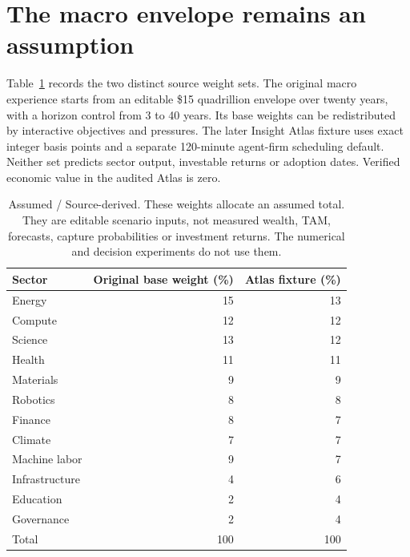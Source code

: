 \documentclass[11pt,a4paper]{article}
\newcommand{\assum}{\textsf{Assumed}}
\newcommand{\source}{\textsf{Source-derived}}
\begin{document}
\section{The macro envelope remains an assumption}\label{app:macro}
Table~\ref{tab:macro} records the two distinct source weight sets. The original macro experience starts from an editable \$15 quadrillion envelope over twenty years, with a horizon control from 3 to 40 years. Its base weights can be redistributed by interactive objectives and pressures. The later Insight Atlas fixture uses exact integer basis points and a separate 120-minute agent-firm scheduling default. Neither set predicts sector output, investable returns or adoption dates. Verified economic value in the audited Atlas is zero. \citep{atlas2026,treasure2026}

\begin{table}[ht]\centering\small
\begin{tabular}{@{}lrr@{}}\toprule
Sector & Original base weight (\%) & Atlas fixture (\%)\\\midrule
Energy &15&13\\
Compute &12&12\\
Science &13&12\\
Health &11&11\\
Materials &9&9\\
Robotics &8&8\\
Finance &8&7\\
Climate &7&7\\
Machine labor &9&7\\
Infrastructure &4&6\\
Education &2&4\\
Governance &2&4\\\midrule
Total &100&100\\\bottomrule
\end{tabular}
\caption{\assum{} / \source{}. These weights allocate an assumed total. They are editable scenario inputs, not measured wealth, TAM, forecasts, capture probabilities or investment returns. The numerical and decision experiments do not use them.}
\label{tab:macro}\end{table}

\FloatBarrier
\end{document}
